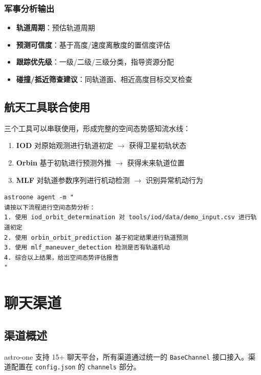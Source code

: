 \documentclass[12pt,a4paper,UTF8]{ctexart}
\begin{document}
\subsection{军事分析输出}
\begin{itemize}
    \item \textbf{轨道周期}：预估轨道周期
    \item \textbf{预测可信度}：基于高度/速度离散度的置信度评估
    \item \textbf{跟踪优先级}：一级/二级/三级分类，指导资源分配
    \item \textbf{碰撞/抵近筛查建议}：同轨道面、相近高度目标交叉检查
\end{itemize}

\section{航天工具联合使用}

三个工具可以串联使用，形成完整的空间态势感知流水线：

\begin{enumerate}
    \item \textbf{IOD} 对原始观测进行轨道初定 $\rightarrow$ 获得卫星初轨状态
    \item \textbf{Orbin} 基于初轨进行预测外推 $\rightarrow$ 获得未来轨道位置
    \item \textbf{MLF} 对轨道参数序列进行机动检测 $\rightarrow$ 识别异常机动行为
\end{enumerate}

\begin{verbatim}
astroone agent -m "
请按以下流程进行空间态势分析：
1. 使用 iod_orbit_determination 对 tools/iod/data/demo_input.csv 进行轨道初定
2. 使用 orbin_orbit_prediction 基于初定结果进行轨道预测
3. 使用 mlf_maneuver_detection 检测是否有轨道机动
4. 综合以上结果，给出空间态势评估报告
"
\end{verbatim}

\chapter{聊天渠道}

\section{渠道概述}

astro-one 支持 15+ 聊天平台，所有渠道通过统一的 \texttt{BaseChannel} 接口接入。渠道配置在 \texttt{config.json} 的 \texttt{channels} 部分。
\end{document}
